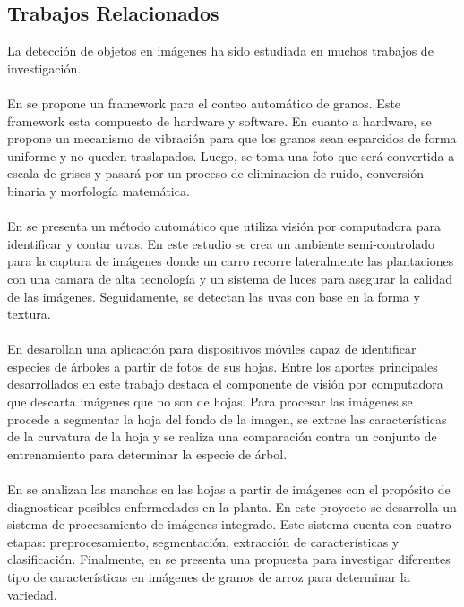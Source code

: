 \subsection{Trabajos Relacionados}
La detecci\'on de objetos en im\'agenes ha sido estudiada en muchos trabajos de investigaci\'on.
\\\\
En \cite{wangwangji} se propone un framework para el conteo autom\'atico de granos. Este framework esta compuesto de hardware y software. En cuanto a hardware, se propone un mecanismo de vibraci\'on para que los granos sean esparcidos de forma uniforme y no queden traslapados. Luego, se toma una foto que ser\'a convertida a escala de grises y pasar\'a por un proceso de eliminacion de ruido, conversi\'on binaria y morfolog\'ia matem\'atica.
\\\\
En \cite{nuske} se presenta un m\'etodo autom\'atico que utiliza visi\'on por computadora para identificar y contar uvas. En este estudio se crea un ambiente semi-controlado para la captura de im\'agenes donde un carro recorre lateralmente las plantaciones con una camara de alta tecnolog\'ia y un sistema de luces para asegurar la calidad de las im\'agenes. Seguidamente, se detectan las uvas con base en la forma y textura.
\\\\
En \cite{leafsnap} desarollan una aplicaci\'on para dispositivos m\'oviles capaz de identificar especies de \'arboles a partir de fotos de sus hojas. Entre los aportes principales desarrollados en este trabajo destaca el componente de visi\'on por computadora que descarta im\'agenes que no son de hojas. Para procesar las im\'agenes se procede a segmentar la hoja del fondo de la imagen, se extrae las caracter\'isticas de la curvatura de la hoja y se realiza una comparaci\'on contra un conjunto de entrenamiento para determinar la especie de \'arbol.
\\\\
En \cite{helly} se analizan las manchas en las hojas a partir de im\'agenes con el prop\'osito de diagnosticar posibles enfermedades en la planta. En este proyecto se desarrolla un sistema de procesamiento de im\'agenes integrado. Este sistema cuenta con cuatro etapas: preprocesamiento, segmentaci\'on, extracci\'on de caracter\'isticas y clasificaci\'on. Finalmente, en \cite{periasamy} se presenta una propuesta para investigar diferentes tipo de caracter\'isticas en im\'agenes de granos de arroz para determinar la variedad.

